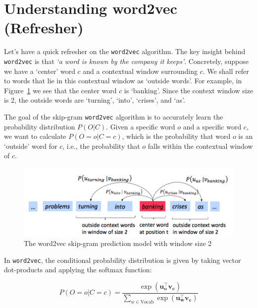 \section{Understanding word2vec (Refresher)}
Let's have a quick refresher on the {\tt word2vec} algorithm. The key insight behind {\tt word2vec} is that \textit{`a word is known by the company it keeps'}. Concretely, suppose we have a `center' word $c$ and a contextual window surrounding $c$. We shall refer to words that lie in this contextual window as `outside words'. For example, in Figure~\ref{fig:word2vec} we see that the center word $c$ is `banking'. Since the context window size is 2, the outside words are `turning', `into', `crises', and `as'. \newline

The goal of the skip-gram {\tt word2vec} algorithm is to accurately learn the probability distribution $P(O \vert C)$. Given a specific word $o$ and a specific word $c$, we want to calculate $P(O=o \vert C=c)$, which is the probability that word $o$ is an `outside' word for $c$, i.e., the probability that $o$ falls within the contextual window of $c$.

\begin{figure}[h]
    \centering
    \includegraphics[width=\textwidth]{word2vec.png}
    \caption{The word2vec skip-gram prediction model with window size 2}\label{fig:word2vec}
\end{figure}

In {\tt word2vec}, the conditional probability distribution is given by taking vector dot-products and applying the softmax function: %

\begin{equation}
 P(O=o \vert C=c) = \frac{\exp(\bm{u_{o}^{\top} v_c})}{\sum_{w \in \text{Vocab}} \exp(\bm{u_{w}^{\top} \bm v_c})} %
 \label{word2vec_condprob}
\end{equation}

